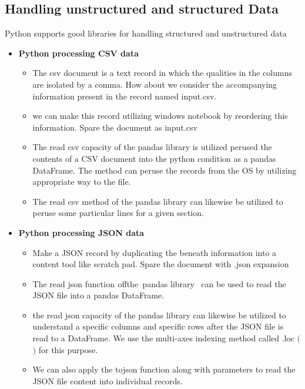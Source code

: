 \documentclass[oneside,12pt]{Classes/VTU}
\begin{document}
	\subsection{Handling unstructured and structured Data} Python supports good libraries for handling structured and unstructured data
	\begin{itemize}
		\item \textbf{Python processing CSV data}
		\begin{itemize}
			\item The csv document is a text record in which the qualities in the columns are isolated by a comma. How about we consider the accompanying information present in the record named input.csv.
			\item we can make this record utilizing windows notebook by reordering this information. Spare the document as input.csv
			\item The read csv capacity of the pandas library is utilized perused the contents of a CSV document into the python condition as a pandas DataFrame. The method can peruse the records from the OS by utilizing appropriate way to the file.
			\item The read csv method of the pandas library can likewise be utilized to peruse some particular lines for a given section.
		\end{itemize} 
		\item \textbf{Python processing JSON data}
		\begin{itemize}
			\item Make a JSON record by duplicating the beneath information into a content tool like scratch pad. Spare the document with .json expansion
			\item The read json function\tiny\textcolor{white}{s}\normalsize of\tiny\textcolor{white}{f}\normalsize the\tiny\textcolor{white}{y}\normalsize pandas library\tiny\textcolor{white}{es}\normalsize can be used to read the JSON file into a pandas DataFrame. 
			\item the read json capacity of the pandas library can likewise be utilized to understand a specific columns and specific rows after the JSON file is read to a DataFrame. We use the multi-axes indexing method called .loc $($ $)$ for this purpose.
			\item We can also apply the tojson function along with parameters to read the JSON file content into individual records.
		\end{itemize} 
	\end{itemize}
	
\end{document}
